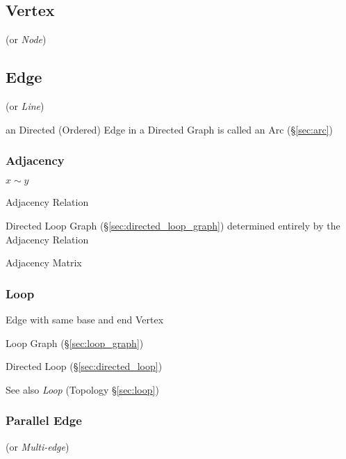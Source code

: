 \subsection{Vertex}\label{sec:vertex}

(or \emph{Node})



\subsection{Edge}\label{sec:edge}

(or \emph{Line})

an Directed (Ordered) Edge in a Directed Graph is called an Arc
(\S\ref{sec:arc})



\subsubsection{Adjacency}\label{sec:adjacency}

$x \sim y$

Adjacency Relation

Directed Loop Graph (\S\ref{sec:directed_loop_graph}) determined
entirely by the Adjacency Relation

Adjacency Matrix



\subsubsection{Loop}\label{sec:graph_loop}

Edge with same base and end Vertex

Loop Graph (\S\ref{sec:loop_graph})

Directed Loop (\S\ref{sec:directed_loop})

\fist See also \emph{Loop} (Topology \S\ref{sec:loop})



\subsubsection{Parallel Edge}\label{sec:parallel_edge}

(or \emph{Multi-edge})

